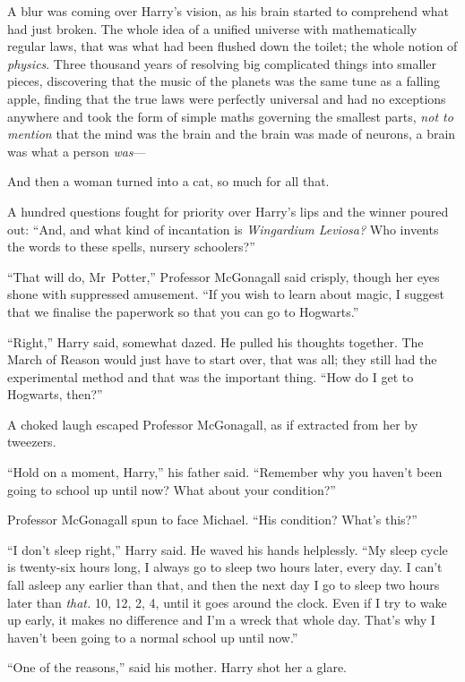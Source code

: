 A blur was coming over Harry’s vision, as his brain started to comprehend what had just broken. The whole idea of a unified universe with mathematically regular laws, that was what had been flushed down the toilet; the whole notion of \emph{physics}. Three thousand years of resolving big complicated things into smaller pieces, discovering that the music of the planets was the same tune as a falling apple, finding that the true laws were perfectly universal and had no exceptions anywhere and took the form of simple maths governing the smallest parts, \emph{not to mention} that the mind was the brain and the brain was made of neurons, a brain was what a person \emph{was}—

And then a woman turned into a cat, so much for all that.

A hundred questions fought for priority over Harry’s lips and the winner poured out: “And, and what kind of incantation is \emph{Wingardium Leviosa?} Who invents the words to these spells, nursery schoolers?”

“That will do, Mr~Potter,” Professor McGonagall said crisply, though her eyes shone with suppressed amusement. “If you wish to learn about magic, I suggest that we finalise the paperwork so that you can go to Hogwarts.”

“Right,” Harry said, somewhat dazed. He pulled his thoughts together. The March of Reason would just have to start over, that was all; they still had the experimental method and that was the important thing. “How do I get to Hogwarts, then?”

A choked laugh escaped Professor McGonagall, as if extracted from her by tweezers.

“Hold on a moment, Harry,” his father said. “Remember why you haven’t been going to school up until now? What about your condition?”

Professor McGonagall spun to face Michael. “His condition? What’s this?”

“I don’t sleep right,” Harry said. He waved his hands helplessly. “My sleep cycle is twenty-six hours long, I always go to sleep two hours later, every day. I can’t fall asleep any earlier than that, and then the next day I go to sleep two hours later than \emph{that.} 10\PM, 12\AM, 2\AM, 4\AM, until it goes around the clock. Even if I try to wake up early, it makes no difference and I’m a wreck that whole day. That’s why I haven’t been going to a normal school up until now.”

“One of the reasons,” said his mother. Harry shot her a glare.

